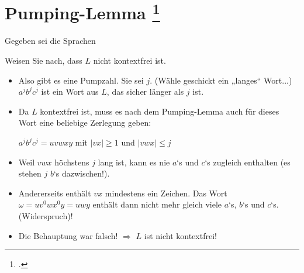 \documentclass{lehramt-informatik-aufgabe}
\begin{document}
\section{Pumping-Lemma
\footcite[Seite 42]{theo:fs:2}}

Gegeben sei die Sprachen

\begin{center}
\end{center}

\noindent
Weisen Sie nach, dass $L$ nicht kontextfrei ist.

\begin{liAntwort}
\begin{itemize}
\item Also gibt es eine Pumpzahl. Sie sei $j$.
(Wähle geschickt ein „langes“ Wort...)
$a^j b^j c^j$ ist ein Wort aus $L$, das sicher länger als $j$ ist.

\item Da $L$ kontextfrei ist, muss es nach dem Pumping-Lemma auch für
dieses Wort eine beliebige Zerlegung geben:

$a^j b^j c^j = uvwxy$ mit $|vx| \geq 1$ und $|vwx| \leq j$

\item Weil $vwx$ höchstens $j$ lang ist, kann es nie $a$‘s und $c$‘s
zugleich enthalten (es stehen $j$ $b$‘s dazwischen!).

\item Andererseits enthält $vx$ mindestens ein Zeichen. Das Wort $\omega
= uv^0 wx^0 y = uwy$ enthält dann nicht mehr gleich viele $a$‘s, $b$‘s
und $c$‘s. (Widerspruch)!

\item Die Behauptung war falsch! $\Rightarrow$ $L$ ist nicht kontextfrei!
\end{itemize}
\end{liAntwort}
\end{document}
